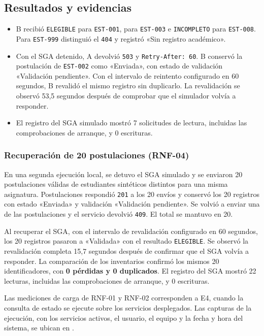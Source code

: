 \subsection{Resultados y evidencias}

\begin{itemize}
  \item B recibió \texttt{ELEGIBLE} para \texttt{EST-001},
     para \texttt{EST-003} e \texttt{INCOMPLETO}
    para \texttt{EST-008}. Para \texttt{EST-999} distinguió el
    \texttt{404} y registró «Sin registro académico».
  \item Con el SGA detenido, A devolvió \texttt{503} y
    \texttt{Retry-After: 60}. B conservó la postulación de
    \texttt{EST-002} como «Enviada», con estado de validación
    «Validación pendiente». Con el intervalo de reintento configurado
    en 60 segundos, B revalidó el mismo registro sin duplicarlo. La
    revalidación se observó 53,5 segundos después de comprobar que el
    simulador volvía a responder.
  \item El registro del SGA simulado mostró 7 solicitudes de lectura,
    incluidas las comprobaciones de arranque, y 0 escrituras.
\end{itemize}

\subsubsection{Recuperación de 20 postulaciones (RNF-04)}

En una segunda ejecución local, se detuvo el SGA simulado y se enviaron
20 postulaciones válidas de estudiantes sintéticos distintos para una
misma asignatura. Postulaciones respondió \texttt{201} a los 20 envíos
y conservó los 20 registros con estado «Enviada» y validación
«Validación pendiente». Se volvió a enviar una de las postulaciones
y el servicio devolvió \texttt{409}. El total se mantuvo en 20.

Al recuperar el SGA, con el intervalo de revalidación configurado
en 60 segundos, los 20 registros pasaron a «Validada» con el
resultado \texttt{ELEGIBLE}. Se observó la revalidación completa
15,7 segundos después de confirmar que el SGA volvía a responder.
La comparación de los inventarios confirmó los mismos 20
identificadores, con \textbf{0 pérdidas y 0 duplicados}. El registro
del SGA mostró 22 lecturas, incluidas las comprobaciones de arranque,
y 0 escrituras.

Las mediciones de carga de RNF-01 y RNF-02 corresponden a E4, cuando
la consulta de estado se ejecute sobre los servicios desplegados. Las
capturas de la ejecución, con los servicios activos, el usuario, el
equipo y la fecha y hora del sistema, se ubican en
.
